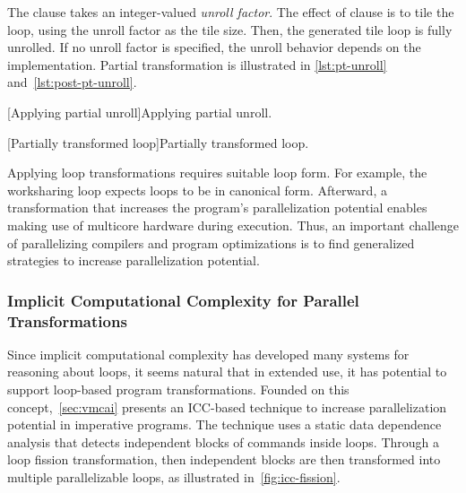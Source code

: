 The  clause takes an integer-valued \emph{unroll factor}.
The effect of  clause is to tile the loop, using the unroll factor as the tile size.
Then, the generated tile loop is fully unrolled.
If no unroll factor is specified, the unroll behavior depends on the implementation.
Partial transformation is illustrated in \autoref{lst:pt-unroll} and~\autoref{lst:post-pt-unroll}.

\begin{center}
\begin{minipage}{\textwidth}
\begin{minipage}{.45\textwidth}
    [Applying partial unroll]{Applying partial unroll.}
    \label{lst:pt-unroll}
\end{minipage}\hfill%
\begin{minipage}{.45\textwidth}
    [Partially transformed loop]{Partially transformed loop.}
    \label{lst:post-pt-unroll}
\end{minipage}
\end{minipage}
\end{center}

Applying loop transformations requires suitable loop form.
For example, the worksharing loop expects loops to be in canonical form.
Afterward, a transformation that increases the program's parallelization potential enables making use of multicore hardware during execution.
Thus, an important challenge of parallelizing compilers and program optimizations is to find generalized strategies to increase parallelization potential.

\subsubsection{Implicit Computational Complexity for Parallel Transformations}
\label{icc-fission}

Since implicit computational complexity has developed many systems for reasoning about loops, it seems natural that in extended use, it has potential to support loop-based program transformations.
Founded on this concept,~\autoref{sec:vmcai} presents an ICC-based technique to increase parallelization potential in imperative programs.
The technique uses a static data dependence analysis that detects independent blocks of commands inside loops.
Through a loop fission transformation,
then independent blocks are then transformed into multiple parallelizable loops, as illustrated in~\autoref{fig:icc-fission}.

